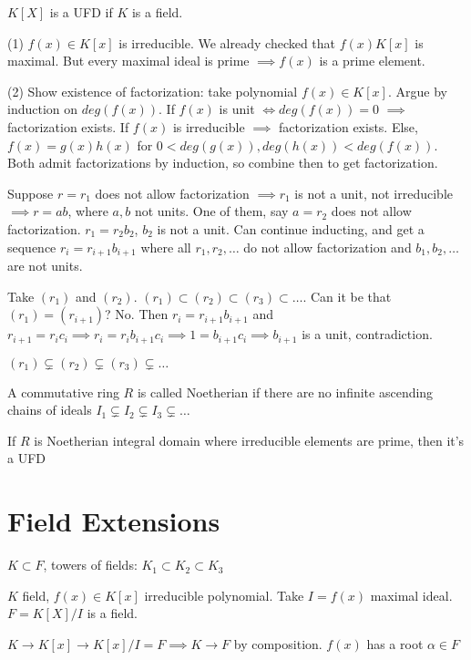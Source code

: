 \documentclass[twoside, 10pt]{article}
\begin{document}
\begin{exm*}
    $K[X]$ is a UFD if $K$ is a field.
\end{exm*}
(1) $f(x) \in K[x]$ is irreducible. We already checked that $f(x)K[x]$ is maximal. But every maximal ideal is prime $\implies f(x)$ is a prime element.

(2) Show existence of factorization: take polynomial $f(x) \in K[x]$. Argue by induction on $deg(f(x))$. If $f(x)$ is unit $\iff deg(f(x)) = 0$ $\implies$ factorization exists. If $f(x)$ is irreducible $\implies$ factorization exists. Else, $f(x) = g(x)h(x)$ for $0 < deg(g(x)), deg(h(x)) < deg(f(x))$. Both admit factorizations by induction, so combine then to get factorization.

Suppose $r = r_1$ does not allow factorization $\implies r_1$ is not a unit, not irreducible $\implies r = ab$, where $a, b$ not units. One of them, say $a = r_2$ does not allow factorization. $r_1 = r_2b_2$, $b_2$ is not a unit. Can continue inducting, and get a sequence $r_i = r_{i+1}b_{i+1}$ where all $r_1, r_2, \ldots$ do not allow factorization and $b_1, b_2, \ldots$ are not units. 

Take $(r_1)$ and $(r_2)$. $(r_1) \subset (r_2) \subset (r_3) \subset \ldots$. Can it be that $(r_1) = (r_{i +1})$? No. Then $r_i = r_{i +1}b_{i + 1}$ and $r_{i + 1} = r_ic_i \implies r_i = r_ib_{i + 1}c_i \implies 1 = b_{i+1}c_i \implies b_{i +1}$ is a unit, contradiction.

$(r_1) \subsetneq (r_2) \subsetneq (r_3) \subsetneq \ldots$

\begin{defn}
    A commutative ring $R$ is called Noetherian if there are no infinite ascending chains of ideals $I_1 \subsetneq I_2 \subsetneq I_3 \subsetneq \ldots$
\end{defn}

\begin{cor}
    If $R$ is Noetherian integral domain where irreducible elements are prime, then it's a UFD
\end{cor}

\section{Field Extensions}
$K \subset F$, towers of fields: $K_1 \subset K_2 \subset K_3$

$K$ field, $f(x) \in K[x]$ irreducible polynomial. Take $I = f(x)$ maximal ideal. $F = K[X]/I$ is a field.
\begin{thm}
    $K \to K[x] \to K[x]/I = F \implies K \to F$ by composition. $f(x)$ has a root $\alpha \in F$
\end{thm}
\end{document}
